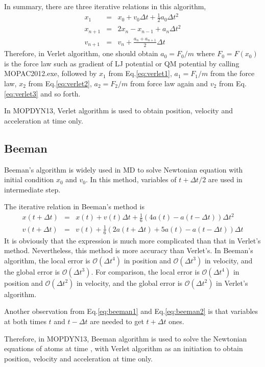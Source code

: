 \documentclass[11pt]{JHEP3}
\begin{document}
In summary, there are three iterative relations in this algorithm,
\begin{eqnarray}
x_1\quad &=& x_0+v_0 \Delta t + \frac{1}{2} a_0 \Delta t^2
\label{eq:verlet1} \\ x_{n+1} &=& 2x_n -x_{n-1} + a_n \Delta t^2
\label{eq:verlet2}\\  v_{n+1} &=& v_n + \frac{a_n+a_{n+1}}{2}\Delta
t \label{eq:verlet3}
\end{eqnarray}
 Therefore, in Verlet algorithm, one should obtain $a_0=F_0/m$
 where $F_0=F(x_0)$ is the force law such as gradient of LJ potential or QM potential by calling MOPAC2012.exe, followed
by $x_1$ from Eq.\ref{eq:verlet1}, $a_1=F_1/m$ from the force law,
$x_2$ from Eq.\ref{eq:verlet2}, $a_2=F_2/m$ from force law again and
$v_2$ from Eq.\ref{eq:verlet3} and so forth.

In MOPDYN13, Verlet algorithm is used to obtain position, velocity
and acceleration at time  only.

\subsection{Beeman}
Beeman's algorithm is widely used in MD to solve Newtonian equation
with initial condition $x_0$ and $v_0$. In this method, variables of
$t+\Delta t/2$ are used in intermediate step.

The iterative relation in Beeman's method is
\begin{eqnarray}
x(t+\Delta t) &=& x(t) + v(t)\Delta t +\frac{1}{6}(4a(t)-a(t-\Delta
t)) \Delta t^2 \label{eq:beeman1}\\
v(t+\Delta t) &=& v(t) + \frac{1}{6}(2a(t+\Delta t) + 5a(t) -
a(t-\Delta t))\Delta t \label{eq:beeman2}
\end{eqnarray}
It is obviously that the expression is much more complicated than
that in Verlet's method. Nevertheless, this method is more accuracy
than Verlet's. In Beeman's algorithm, the local error is
$\mathcal{O}(\Delta t^4)$ in position and $\mathcal{O}(\Delta t^3)$
in velocity, and the global error is $\mathcal{O}(\Delta t^3)$. For
comparison, the local error is $\mathcal{O}(\Delta t^4)$ in position
and $\mathcal{O}(\Delta t^2)$ in velocity, and the global error is
$\mathcal{O}(\Delta t^2)$ in Verlet's algorithm.

Another observation from Eq.\ref{eq:beeman1} and Eq.\ref{eq:beeman2}
is that variables at both times $t$ and $t-\Delta t$ are needed to
get $t+\Delta t$ ones.

Therefore, in MOPDYN13, Beeman algorithm is used to solve the
Newtonian equations of atoms at time , with Verlet
algorithm as an initiation to obtain position, velocity and
acceleration at time  only.
\end{document}
